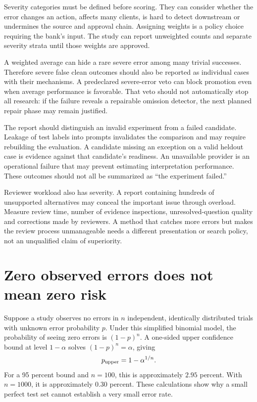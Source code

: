 Severity categories must be defined before scoring. They can consider whether the
error changes an action, affects many clients, is hard to detect downstream or
undermines the source and approval chain. Assigning weights is a policy choice
requiring the bank's input. The study can report unweighted counts and separate
severity strata until those weights are approved.

A weighted average can hide a rare severe error among many trivial successes.
Therefore severe false clean outcomes should also be reported as individual cases
with their mechanisms. A predeclared severe-error veto can block promotion even
when average performance is favorable. That veto should not automatically stop
all research: if the failure reveals a repairable omission detector, the next
planned repair phase may remain justified.

The report should distinguish an invalid experiment from a failed candidate.
Leakage of test labels into prompts invalidates the comparison and may require
rebuilding the evaluation. A candidate missing an exception on a valid heldout
case is evidence against that candidate's readiness. An unavailable provider is
an operational failure that may prevent estimating interpretation performance.
These outcomes should not all be summarized as ``the experiment failed.''

Reviewer workload also has severity. A report containing hundreds of unsupported
alternatives may conceal the important issue through overload. Measure review
time, number of evidence inspections, unresolved-question quality and corrections
made by reviewers. A method that catches more errors but makes the review process
unmanageable needs a different presentation or search policy, not an unqualified
claim of superiority.

\section{Zero observed errors does not mean zero risk}
\label{merge:M09:07}


Suppose a study observes no errors in $n$ independent, identically distributed
trials with unknown error probability $p$. Under this simplified binomial model,
the probability of seeing zero errors is $(1-p)^n$. A one-sided upper confidence
bound at level $1-\alpha$ solves $(1-p)^n=\alpha$, giving
\begin{equation}
 p_{\rm upper}=1-\alpha^{1/n}.
 \label{eq:zero-errors}
\end{equation}
For a 95 percent bound and $n=100$, this is approximately $2.95$ percent. With
$n=1000$, it is approximately $0.30$ percent. These calculations show why a small
perfect test set cannot establish a very small error rate.

